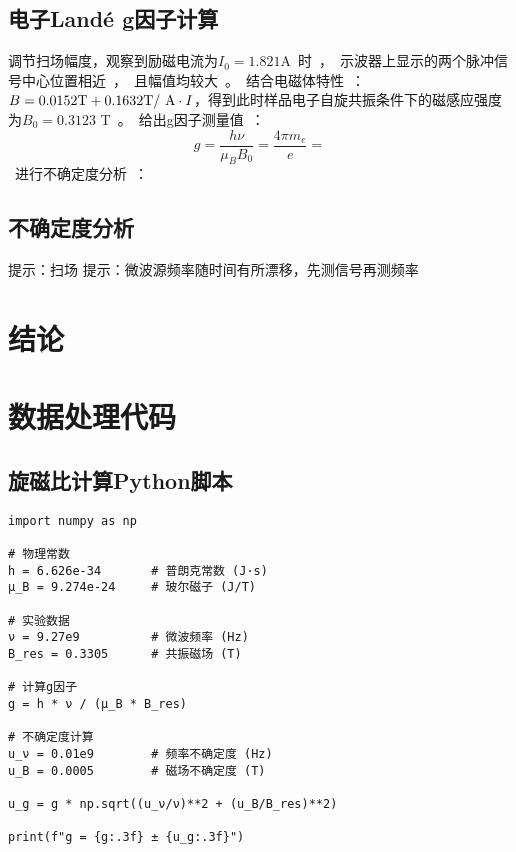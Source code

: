 \documentclass{thuemp}
\begin{document}
\subsection{电子Landé g因子计算}

调节扫场幅度，观察到励磁电流为$I_0 = 1.821$\si\ampere 时，示波器上显示的两个脉冲信号中心位置相近，且幅值均较大。结合电磁体特性：$B = 0.0152 \text{\si\tesla} + 0.1632 \text{\si\tesla / \si\ampere} \cdot I$，得到此时样品电子自旋共振条件下的磁感应强度为$B_0 = 0.3123$ \si\tesla。给出g因子测量值：

\begin{equation}
g = \frac{h \nu}{\mu_B B_0} = \frac{4\pi m_e}{e} = 
\end{equation}

进行不确定度分析：

\subsection{不确定度分析}

提示：扫场
提示：微波源频率随时间有所漂移，先测信号再测频率

\section{结论}



\renewcommand\refname{\heiti\wuhao\centerline{参考文献}\global\def\refname{参考文献}}
\vskip 12pt

\let\OLDthebibliography\thebibliography
\renewcommand\thebibliography[1]{
  \OLDthebibliography{#1}
  \setlength{\parskip}{0pt}
  \setlength{\itemsep}{0pt plus 0.3ex}
}

{
\renewcommand{\baselinestretch}{0.9}
\liuhao


}

\appendix
\section{数据处理代码}

\subsection{旋磁比计算Python脚本}
\begin{verbatim}
import numpy as np

# 物理常数
h = 6.626e-34       # 普朗克常数 (J·s)
μ_B = 9.274e-24     # 玻尔磁子 (J/T)

# 实验数据
ν = 9.27e9          # 微波频率 (Hz)
B_res = 0.3305      # 共振磁场 (T)

# 计算g因子
g = h * ν / (μ_B * B_res)

# 不确定度计算
u_ν = 0.01e9        # 频率不确定度 (Hz)
u_B = 0.0005        # 磁场不确定度 (T)

u_g = g * np.sqrt((u_ν/ν)**2 + (u_B/B_res)**2)

print(f"g = {g:.3f} ± {u_g:.3f}")
\end{verbatim}
\end{document}
